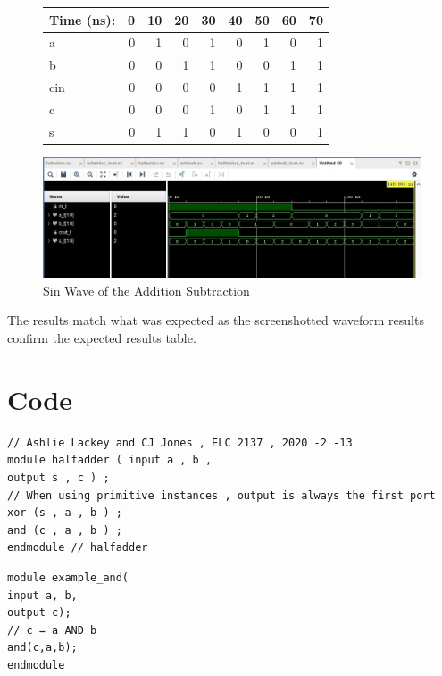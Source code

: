 \documentclass[11pt]{article}
\begin{document}
\begin{figure}[ht]\centering
	\begin{tabular}{l|rrrrrrrr}
		Time (ns): & 0 & 10 & 20 & 30 & 40 & 50 & 60 & 70 \\
		\midrule 
		a &  0 & 1 & 0 & 1 & 0 & 1 & 0 & 1 \\
		b & 0 & 0 & 1 & 1 & 0 & 0 & 1 & 1\\
		cin & 0 & 0 & 0 & 0 & 1 & 1 & 1 & 1 \\
		\midrule
		c & 0 & 0 & 0 & 1 & 0 & 1 & 1 & 1 \\
		s & 0 & 1 & 1 & 0 & 1 & 0 & 0 & 1 \\ \bottomrule
	\end{tabular}\medskip
	

\end{figure}
\begin{figure}
	\includegraphics[width=1.0\textwidth]{"AddSubReal"}
	\caption{Sin Wave of the Addition Subtraction }
\end{figure}
\clearpage

The results match what was expected as the screenshotted waveform results confirm the expected results table. 
\section*{Code}
\begin{lstlisting}[style=Verilog,caption=Half Adder Design Code,label=code:ex ]
// Ashlie Lackey and CJ Jones , ELC 2137 , 2020 -2 -13
module halfadder ( input a , b ,
output s , c ) ;
// When using primitive instances , output is always the first port
xor (s , a , b ) ;
and (c , a , b ) ;
endmodule // halfadder

\end{lstlisting}

\begin{lstlisting}[style=Verilog,caption=Half Adder Testbench Code,label=code:ex ]
module example_and(
input a, b,
output c);
// c = a AND b
and(c,a,b);
endmodule
\end{lstlisting}
\end{document}
